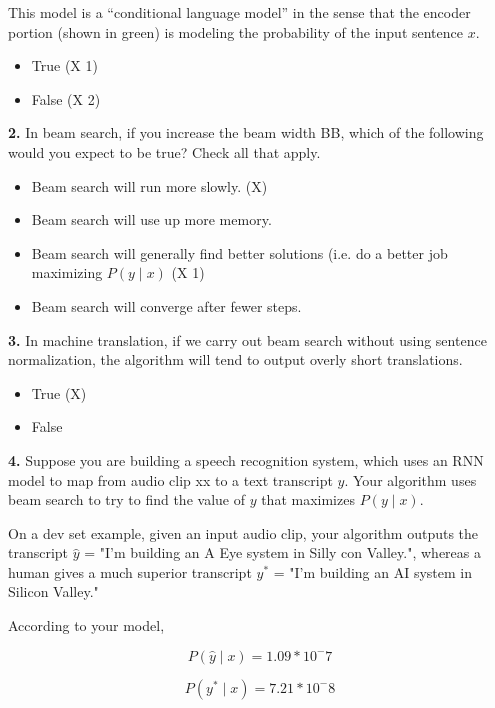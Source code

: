This model is a “conditional language model” in the sense that the encoder portion (shown in green) is modeling the probability of the input sentence $x$.
\begin{itemize}
    \item True (X 1)
    \item False (X 2)
\end{itemize}
\textbf{2.} In beam search, if you increase the beam width BB, which of the following would you expect to be true? Check all that apply.
\begin{itemize}
    \item Beam search will run more slowly. (X)
    \item Beam search will use up more memory.
    \item Beam search will generally find better solutions (i.e. do a better job maximizing $P(y \mid x)$ (X 1)
    \item Beam search will converge after fewer steps.
\end{itemize}
\textbf{3.} In machine translation, if we carry out beam search without using sentence normalization, the algorithm will tend to output overly short translations.
\begin{itemize}
    \item True (X)
    \item False
\end{itemize}
\textbf{4.} Suppose you are building a speech recognition system, which uses an RNN model to map from audio clip xx to a text transcript $y$. Your algorithm uses beam search to try to find the value of $y$ that maximizes $P(y \mid x)$.

On a dev set example, given an input audio clip, your algorithm outputs the transcript $\hat{y}$ = "I'm building an A Eye system in Silly con Valley.", whereas a human gives a much superior transcript $y^*$ = "I'm building an AI system in Silicon Valley."

According to your model,


\begin{equation*}
P(\hat{y} \mid x) = 1.09*10^-7
\end{equation*}

\begin{equation*}
    P(y^* \mid x) = 7.21*10^-8    
\end{equation*}

